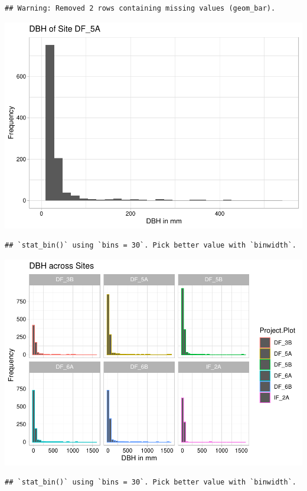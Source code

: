 \documentclass[
  12pt,
]{article}
\begin{document}
\begin{verbatim}
## Warning: Removed 2 rows containing missing values (geom_bar).
\end{verbatim}

\includegraphics{GoldenGriffithsKnierMalinowski_ENV872_Project_files/figure-latex/DBH graphs-5.pdf}

\begin{verbatim}
## `stat_bin()` using `bins = 30`. Pick better value with `binwidth`.
\end{verbatim}

\includegraphics{GoldenGriffithsKnierMalinowski_ENV872_Project_files/figure-latex/DBH graphs-6.pdf}

\begin{verbatim}
## `stat_bin()` using `bins = 30`. Pick better value with `binwidth`.
\end{verbatim}
\end{document}
